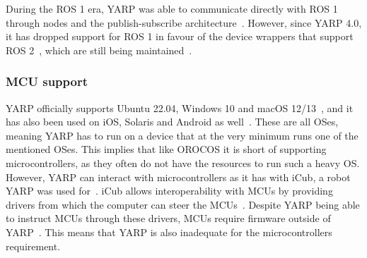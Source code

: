 \documentclass[a4paper]{book}
\begin{document}
\par
During the ROS 1 era, YARP was able to communicate directly with ROS 1 through
nodes and the publish-subscribe architecture~\cite{fitzpatrick2014middle}.
However, since YARP 4.0, it has dropped support for ROS 1 in favour of the
device wrappers that support ROS 2~\cite{yarp_release_v4, yarp_devices_ros},
which are still being maintained~\cite{yarp_devices_ros2}.
\subsubsection{MCU support}
YARP officially supports Ubuntu 22.04, Windows 10 and macOS
12/13~\cite{yarp_repo}, and it has also been used on iOS, Solaris and Android as
well~\cite{yarp_docs_what}. These are all OSes, meaning YARP has to run on a
device that at the very minimum runs one of the mentioned OSes. This implies
that like OROCOS it is short of supporting microcontrollers, as they often do
not have the resources to run such a heavy OS. However, YARP can interact with
microcontrollers as it has with iCub, a robot YARP was used
for~\cite{randazzo2018yarp}. iCub allows interoperability with MCUs by providing
drivers from which the computer can steer the MCUs~\cite{metta2006yarp,
yarp_docs_what}. Despite YARP being able to instruct MCUs through these drivers,
MCUs require firmware outside of YARP~\cite{icub_firmware}. This means that YARP
is also inadequate for the microcontrollers requirement.
\end{document}
